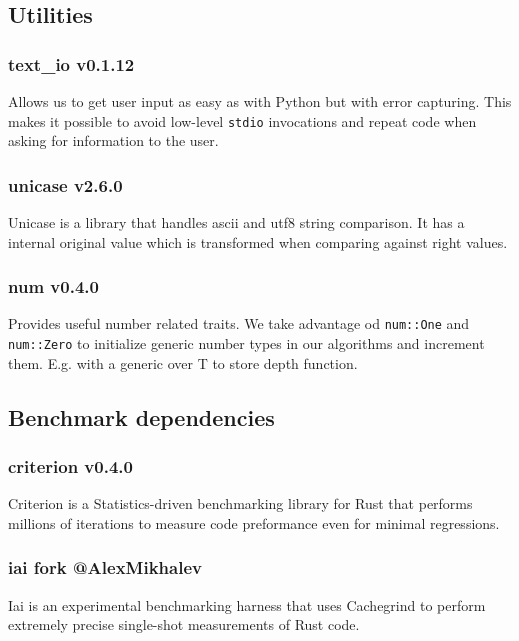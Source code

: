 \subsection{Utilities}

\subsubsection{text\_io v0.1.12}

Allows us to get user input as easy as with Python but with error capturing. This makes it possible to avoid
low-level \texttt{stdio} invocations and repeat code when asking for information to the user.

\subsubsection{unicase v2.6.0}

Unicase is a library that handles ascii and utf8 string comparison. It has a internal original value which is
transformed when comparing against right values.

\subsubsection{num v0.4.0}

Provides useful number related traits. We take advantage od \texttt{num::One} and \texttt{num::Zero} to initialize
generic number types in our algorithms and increment them. E.g. with a generic over T to store depth function.

\subsection{Benchmark dependencies}

\subsubsection{criterion v0.4.0}

Criterion is a Statistics-driven benchmarking library for Rust that performs millions of iterations to measure code preformance
even for minimal regressions. \autocite{criterion}

\subsubsection{iai fork @AlexMikhalev}

Iai is an experimental benchmarking harness that uses Cachegrind to perform extremely precise
single-shot measurements of Rust code.

